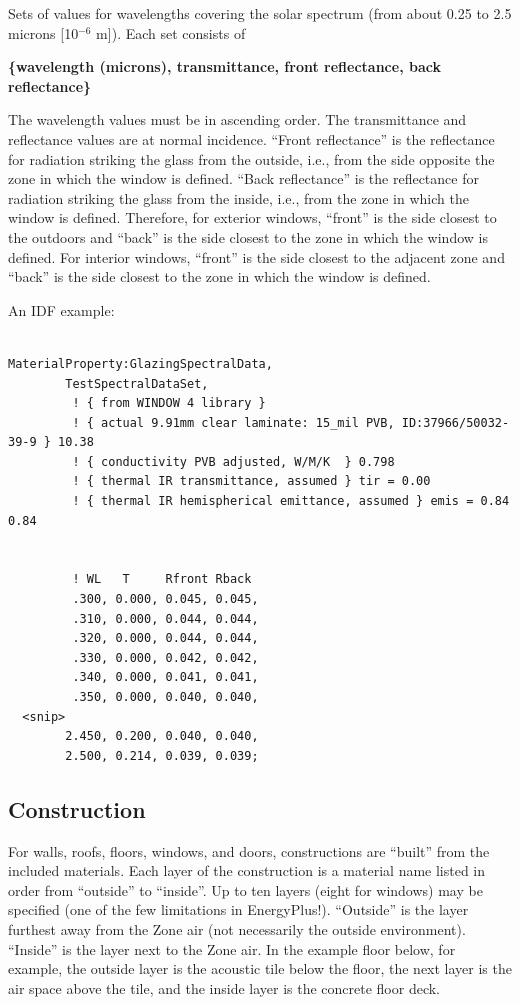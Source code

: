 Sets of values for wavelengths covering the solar spectrum (from about 0.25 to 2.5 microns {[}10\(^{-6}\) m{]}). Each set consists of

\textbf{\{wavelength (microns), transmittance, front reflectance, back reflectance\}}

The wavelength values must be in ascending order. The transmittance and reflectance values are at normal incidence. ``Front reflectance'' is the reflectance for radiation striking the glass from the outside, i.e., from the side opposite the zone in which the window is defined. ``Back reflectance'' is the reflectance for radiation striking the glass from the inside, i.e., from the zone in which the window is defined. Therefore, for exterior windows, ``front'' is the side closest to the outdoors and ``back'' is the side closest to the zone in which the window is defined. For interior windows, ``front'' is the side closest to the adjacent zone and ``back'' is the side closest to the zone in which the window is defined.

An IDF example:

\begin{lstlisting}

MaterialProperty:GlazingSpectralData,
        TestSpectralDataSet,
         ! { from WINDOW 4 library }
         ! { actual 9.91mm clear laminate: 15_mil PVB, ID:37966/50032-39-9 } 10.38
         ! { conductivity PVB adjusted, W/M/K  } 0.798
         ! { thermal IR transmittance, assumed } tir = 0.00
         ! { thermal IR hemispherical emittance, assumed } emis = 0.84 0.84


         ! WL   T     Rfront Rback
         .300, 0.000, 0.045, 0.045,
         .310, 0.000, 0.044, 0.044,
         .320, 0.000, 0.044, 0.044,
         .330, 0.000, 0.042, 0.042,
         .340, 0.000, 0.041, 0.041,
         .350, 0.000, 0.040, 0.040,
  <snip>
        2.450, 0.200, 0.040, 0.040,
        2.500, 0.214, 0.039, 0.039;
\end{lstlisting}

\subsection{Construction}\label{construction-000}

For walls, roofs, floors, windows, and doors, constructions are ``built'' from the included materials. Each layer of the construction is a material name listed in order from ``outside'' to ``inside''. Up to ten layers (eight for windows) may be specified (one of the few limitations in EnergyPlus!). ``Outside'' is the layer furthest away from the Zone air (not necessarily the outside environment). ``Inside'' is the layer next to the Zone air. In the example floor below, for example, the outside layer is the acoustic tile below the floor, the next layer is the air space above the tile, and the inside layer is the concrete floor deck.

